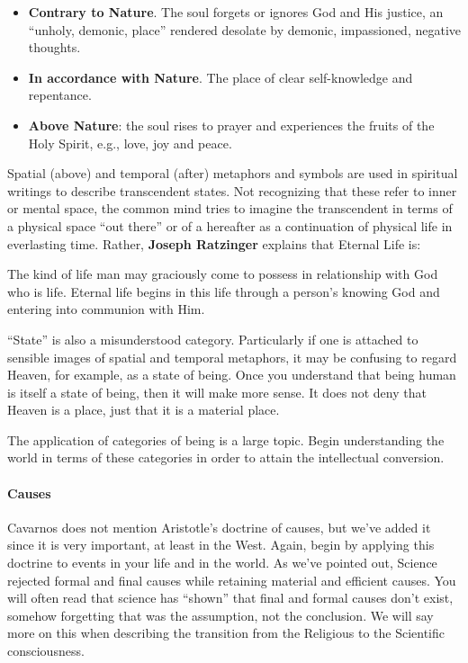 \begin{itemize}
\item \textbf{Contrary to Nature}. The soul forgets or ignores God and His justice, an “unholy, demonic, place” rendered desolate by demonic, impassioned, negative thoughts. 
\item \textbf{In accordance with Nature}. The place of clear self-knowledge and repentance. 
\item \textbf{Above Nature}: the soul rises to prayer and experiences the fruits of the Holy Spirit, e.g., love, joy and peace. 
\end{itemize}
Spatial (above) and temporal (after) metaphors and symbols are used in spiritual writings to describe transcendent states. Not recognizing that these refer to inner or mental space, the common mind tries to imagine the transcendent in terms of a physical space “out there” or of a hereafter as a continuation of physical life in everlasting time. Rather, \textbf{Joseph Ratzinger} explains that Eternal Life is:

\begin{quotex}
The kind of life man may graciously come to possess in relationship with God who is life. Eternal life begins in this life through a person's knowing God and entering into communion with Him. 

\end{quotex}
“State” is also a misunderstood category. Particularly if one is attached to sensible images of spatial and temporal metaphors, it may be confusing to regard Heaven, for example, as a state of being. Once you understand that being human is itself a state of being, then it will make more sense. It does not deny that Heaven is a place, just that it is a material place.

The application of categories of being is a large topic. Begin understanding the world in terms of these categories in order to attain the intellectual conversion.

\paragraph{Causes}
Cavarnos does not mention Aristotle's doctrine of causes, but we've added it since it is very important, at least in the West. Again, begin by applying this doctrine to events in your life and in the world. As we've pointed out, Science rejected formal and final causes while retaining material and efficient causes. You will often read that science has “shown” that final and formal causes don't exist, somehow forgetting that was the assumption, not the conclusion. We will say more on this when describing the transition from the Religious to the Scientific consciousness.


